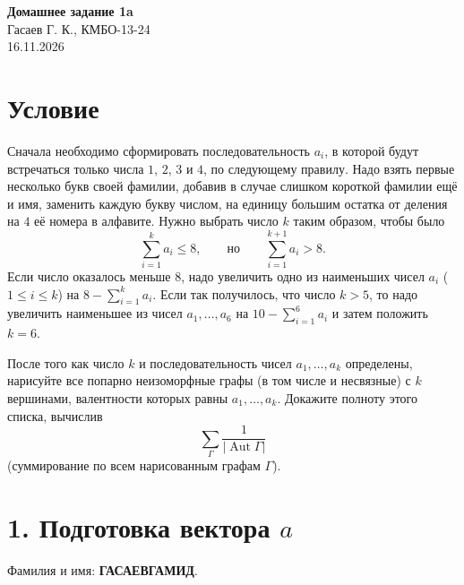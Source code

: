 \documentclass[12pt,a4paper]{article}
\newcommand{\Aut}{\operatorname{Aut}}
\begin{document}
\begin{center}
  {\Large\bfseries Домашнее задание 1a}\\[3pt]
  Гасаев Г. К., КМБО-13-24\\
  16.11.2026
\end{center}

\section*{Условие}
Сначала необходимо сформировать последовательность $a_i$, в которой будут
встречаться только числа $1$, $2$, $3$ и $4$, по следующему правилу.
Надо взять первые несколько букв своей фамилии, добавив в случае слишком
короткой фамилии ещё и имя, заменить каждую букву числом, на единицу большим
остатка от деления на $4$ её номера в алфавите. Нужно выбрать число $k$
таким образом, чтобы было
\[
  \sum_{i=1}^{k}a_i\leq 8,
  \qquad \text{но}\qquad
  \sum_{i=1}^{k+1}a_i>8.
\]
Если число оказалось меньше $8$, надо увеличить одно из наименьших чисел
$a_i$ ($1\leq i\leq k$) на $8-\sum_{i=1}^{k}a_i$.
Если так получилось, что число $k>5$, то надо увеличить наименьшее из чисел
$a_1,\ldots,a_6$ на $10-\sum_{i=1}^{6}a_i$ и затем положить $k=6$.

После того как число $k$ и последовательность чисел $a_1,\ldots,a_k$
определены, нарисуйте все попарно неизоморфные графы (в том числе и несвязные)
с $k$ вершинами, валентности которых равны $a_1,\ldots,a_k$.
Докажите полноту этого списка, вычислив
\[
  \sum_{\Gamma}\frac{1}{|\Aut\Gamma|}
\]
(суммирование по всем нарисованным графам $\Gamma$).

\section*{1. Подготовка вектора $a$}
Фамилия и имя: \textbf{ГАСАЕВГАМИД}.
\end{document}
